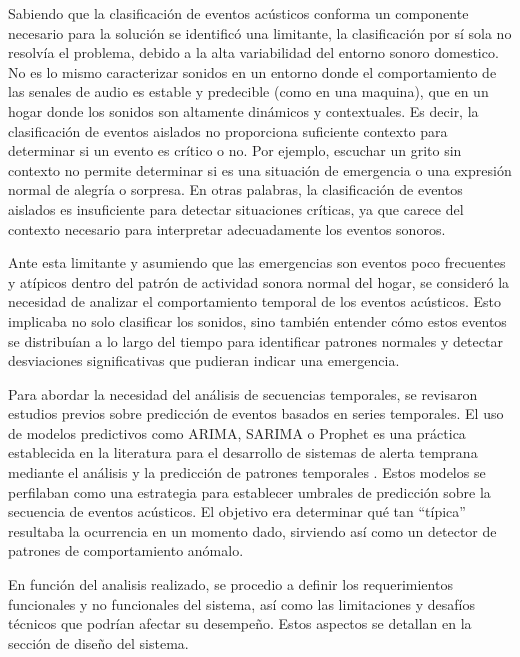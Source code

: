 Sabiendo que la clasificación de eventos acústicos conforma un componente necesario para la solución se identificó una limitante, la clasificación por sí sola no resolvía el problema, debido a la alta variabilidad del entorno sonoro domestico. No es lo mismo caracterizar sonidos en un entorno donde el comportamiento de las senales de audio es estable y predecible (como en una maquina), que en un hogar donde los sonidos son altamente dinámicos y contextuales. Es decir, la clasificación de eventos aislados no proporciona suficiente contexto para determinar si un evento es crítico o no. Por ejemplo, escuchar un grito sin contexto no permite determinar si es una situación de emergencia o una expresión normal de alegría o sorpresa. En otras palabras, la clasificación de eventos aislados es insuficiente para detectar situaciones críticas, ya que carece del contexto necesario para interpretar adecuadamente los eventos sonoros.

Ante esta limitante y asumiendo que las emergencias son eventos poco frecuentes y atípicos dentro del patrón de actividad sonora normal del hogar, se consideró la necesidad de analizar el comportamiento temporal de los eventos acústicos. Esto implicaba no solo clasificar los sonidos, sino también entender cómo estos eventos se distribuían a lo largo del tiempo para identificar patrones normales y detectar desviaciones significativas que pudieran indicar una emergencia.

Para abordar la necesidad del análisis de secuencias temporales, se revisaron estudios previos sobre predicción de eventos basados en series temporales. El uso de modelos predictivos como ARIMA, SARIMA o Prophet es una práctica establecida en la literatura para el desarrollo de sistemas de alerta temprana mediante el análisis y la predicción de patrones temporales \citeauthor{mora2023analisis} \citeyear{mora2023analisis}. Estos modelos se perfilaban como una estrategia para establecer umbrales de predicción sobre la secuencia de eventos acústicos. El objetivo era determinar qué tan ``típica'' resultaba la ocurrencia en un momento dado, sirviendo así como un detector de patrones de comportamiento anómalo.

En función del analisis realizado, se procedio a definir los requerimientos funcionales y no funcionales del sistema, así como las limitaciones y desafíos técnicos que podrían afectar su desempeño. Estos aspectos se detallan en la sección de diseño del sistema.


